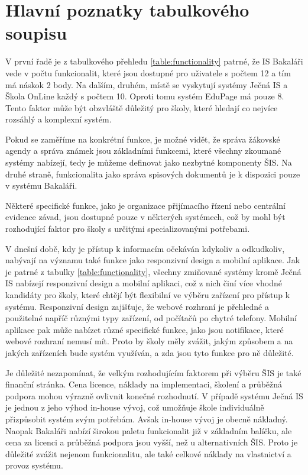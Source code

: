 \documentclass[FM,Proj]{tulthesis}
\begin{document}
\section{Hlavní poznatky tabulkového soupisu}
V první řadě je z tabulkového přehledu \ref{table:functionality} patrné, že IS Bakaláři
vede v počtu funkcionalit, které jsou dostupné pro uživatele s počtem 12 a tím má náskok 2
body. Na dalším, druhém, místě se vyskytují systémy Ječná IS a Škola OnLine každý s počtem 10. 
Oproti tomu systém EduPage má pouze 8. Tento
faktor může být obzvláště důležitý pro školy, které hledají co nejvíce rozsáhlý a komplexní systém.

Pokud se zaměříme na konkrétní funkce, je možné vidět, že správa žákovské agendy a správa známek
jsou základními funkcemi, které všechny zkoumané systémy nabízejí, tedy je můžeme definovat 
jako nezbytné komponenty ŠIS. Na druhé straně, funkcionalita jako správa spisových dokumentů je k dispozici pouze v systému
Bakaláři.

Některé specifické funkce, jako je organizace přijímacího řízení nebo
centrální evidence závad, jsou dostupné pouze v některých systémech, což by mohl
být rozhodující faktor pro školy s určitými specializovanými potřebami.

V dnešní době, kdy je přístup k informacím očekáván kdykoliv
a odkudkoliv, nabývají na významu také funkce jako responzivní 
design a mobilní aplikace. Jak je patrné z tabulky \ref{table:functionality},
všechny zmiňované systémy kromě Ječná IS nabízejí responzivní design a mobilní
aplikaci, což z nich činí více vhodné kandidáty pro školy, které chtějí
být flexibilní ve výběru zařízení pro přístup k systému.
Responzivní design zajišťuje, že webové rozhraní je přehledné
a použitelné napříč různými typy zařízení, od počítačů po chytré telefony.
Mobilní aplikace pak může nabízet různé specifické funkce, jako jsou
notifikace, které webové rozhraní nemusí mít. Proto by školy měly zvážit,
jakým způsobem a na jakých zařízeních bude systém využíván, a zda
jsou tyto funkce pro ně důležité. 

Je důležité nezapomínat, že velkým rozhodujícím faktorem při výběru
ŠIS je také finanční stránka. Cena licence, náklady na implementaci, školení a průběžná
podpora mohou výrazně ovlivnit konečné rozhodnutí. V případě systému Ječná IS je jednou
z jeho výhod in-house vývoj, což umožňuje škole individuálně přizpůsobit systém svým
potřebám. Avšak in-house vývoj je obecně nákladný. Naopak Bakaláři nabízí širokou paletu funkcionalit
již v základním balíčku, ale cena za licenci a průběžná podpora jsou vyšší, než u alternativních ŠIS.
Proto je důležité zvážit nejenom funkcionalitu, ale také celkové náklady
na vlastnictví a provoz systému.
\end{document}
